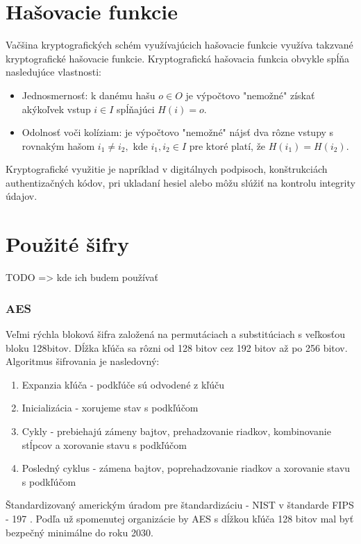 \section{Hašovacie funkcie}
	\newtheorem{Hasovanie}{Hašovacou funkciou nazveme funkciu ktorá k vstupu ľubovolnej dĺžky vráti reťazec bitov pevnej dĺžky. Jej výstup budeme nazývať haš. Formálnejšie  $H : I \rightarrow O$  hašovacou funkciou $H$ nazveme funkciu zobrazujúcu z množiny vstupov $I$ na množinu hašov $O$.  Pre rovnaký vstup bude výstup vždy rovnaký.}
	Vačšina kryptografických schém využívajúcich hašovacie funkcie využíva takzvané kryptografické hašovacie funkcie. Kryptografická hašovacia funkcia obvykle spĺňa nasledujúce vlastnosti:
	\begin{itemize}
		\item Jednosmernosť: k danému hašu $o \in O$ je výpočtovo "nemožné" získať akýkoľvek vstup $i \in I$ spĺňajúci $H(i) = o$.
		\item Odolnosť voči kolíziam: je výpočtovo "nemožné" nájsť dva rôzne vstupy s rovnakým hašom $i_1 \ne i_2,$ kde $i_1,i_2 \in I$ pre ktoré platí, že $H(i_1) = H(i_2)$.
	\end{itemize}
	Kryptografické využitie je napríklad v digitálnych podpisoch, konštrukciách authentizačných kódov, pri ukladaní hesiel alebo môžu slúžiť na kontrolu integrity údajov.


\section{Použité šifry}

	TODO => kde ich budem používať
	
	\subsubsection{AES}
		
		Veľmi rýchla bloková šifra založená na permutáciach a substitúciach s veľkosťou bloku 128bitov. Dĺžka kľúča sa rôzni od 128 bitov cez 192 bitov až po 256 bitov. Algoritmus šifrovania je nasledovný: 
		\begin{enumerate}
			\item Expanzia kľúča - podkľúče sú odvodené z kľúču
			\item Inicializácia - xorujeme stav s podkľúčom
			\item Cykly - prebiehajú zámeny bajtov, prehadzovanie riadkov, kombinovanie stĺpcov a xorovanie stavu s podkľúčom 
			\item Posledný cyklus - zámena bajtov, poprehadzovanie riadkov a xorovanie stavu s podkľúčom 
		\end{enumerate}
		Štandardizovaný americkým úradom pre štandardizáciu - NIST v štandarde FIPS - 197 \cite{FIPS197}. Podľa už spomenutej organizácie by AES s dĺžkou kľúča 128 bitov mal byť bezpečný minimálne do roku 2030.


